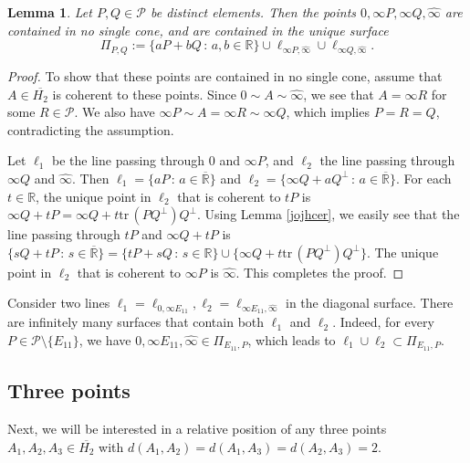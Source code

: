 \documentclass[10pt,a4paper]{amsart}
\providecommand{\index}[1]{}
\newcommand\cP{{\mathcal{P}}}
\newcommand\bR{{\mathbb{R}}}
\newcommand\oH{{\overline{H_2}}}
\newcommand\oi{{\widehat{\infty}}}
\newcommand\oR{{\overline{\mathbb{R}}}}
\newtheorem{lemma}[theorem]{Lemma}
\theoremstyle{definition}
\theoremstyle{remark}
\numberwithin{subsection}{section}
\numberwithin{equation}{section}
\begin{document}
\begin{lemma}\label{inftysurface}
Let $P, Q\in \cP$ be distinct elements. 
Then the points $0, \infty P, \infty Q, \oi$ are contained in no single cone, and are contained in the unique surface 
\begin{equation}\label{PI}
\Pi_{P, Q}:=\{aP+bQ\,:\, a, b\in \bR\}\cup \ell_{\infty P, \oi}\cup \ell_{\infty Q, \oi}.\index{$PiPQ$@$\Pi_{P, Q}$}
\end{equation}
\end{lemma}
\begin{proof}
To show that these points are contained in no single cone, assume that $A\in \oH$ is coherent to these points. Since $0\sim A\sim \oi$, we see that $A=\infty R$ for some $R\in \cP$. 
We also have $\infty P\sim A=\infty R\sim \infty Q$, which implies $P=R=Q$, contradicting the assumption. 

Let $\ell_1$ be the line passing through $0$ and $\infty P$, and $\ell_2$ the line passing through $\infty Q$ and $\oi$. Then $\ell_1=\{aP\,:\, a\in {\oR}\}$ and $\ell_2=\{\infty Q+ aQ^\perp\,:\, a\in {\oR}\}$. 
For each $t\in\mathbb{R}$, the unique point in $\ell_2$ that is coherent to $tP$ is $\infty Q+tP=\infty Q+t\mathrm{tr}\,(PQ^\perp)Q^\perp$. Using Lemma \ref{jojhcer}, we easily see that
the line passing through $tP$ and $\infty Q+tP$ is $\{sQ+tP\,:\, s\in \oR\} =\{tP+sQ\,:\, s\in \mathbb{R}\}\cup \{\infty Q+t\mathrm{tr}\,(PQ^\perp)Q^\perp\}$. 
The unique point in $\ell_2$ that is coherent to $\infty P$ is $\oi$. 
This completes the proof.
\end{proof}

Consider two lines $\ell_1=\ell_{0, \infty E_{11}}, \ell_2=\ell_{\infty E_{11}, \oi}$ in the diagonal surface. 
There are infinitely many surfaces that contain both $\ell_1$ and $\ell_2$. 
Indeed, for every $P\in \mathcal{P}\setminus\{E_{11}\}$, we have $0, \infty E_{11}, \oi\in \Pi_{E_{11}, P}$, which leads to $\ell_1\cup \ell_2\subset \Pi_{E_{11}, P}$.


\subsection{Three points}\label{three points}
Next, we will be interested in a relative position of any three points $A_1 , A_2 , A_3 \in \oH$ with $d(A_1 , A_2 ) = d(A_1 , A_3 ) = d(A_2 , A_3 ) = 2$.
\end{document}
